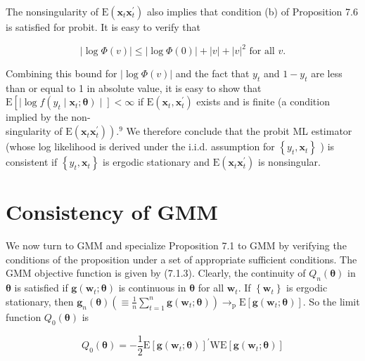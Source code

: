 \documentclass[10pt]{article}
\begin{document}
The nonsingularity of $\mathrm{E}\left(\mathbf{x}_{t} \mathbf{x}_{t}^{\prime}\right)$ also implies that condition (b) of Proposition 7.6 is satisfied for probit. It is easy to verify that


\begin{equation*}
|\log \Phi(v)| \leq|\log \Phi(0)|+|v|+|v|^{2} \text { for all } v . \tag{7.2.14}
\end{equation*}


Combining this bound for $|\log \Phi(v)|$ and the fact that $y_{t}$ and $1-y_{t}$ are less than or equal to 1 in absolute value, it is easy to show that $\mathrm{E}\left[\mid \log f\left(y_{t} \mid\right.\right. \left.\left.\mathbf{x}_{t} ; \boldsymbol{\theta}\right) \mid\right]<\infty$ if $\mathrm{E}\left(\mathbf{x}_{t}, \mathbf{x}_{t}^{\prime}\right)$ exists and is finite (a condition implied by the non-\\
singularity of $\left.\mathrm{E}\left(\mathbf{x}_{t} \mathbf{x}_{t}^{\prime}\right)\right) .{ }^{9}$ We therefore conclude that the probit ML estimator (whose log likelihood is derived under the i.i.d. assumption for $\left\{y_{t}, \mathbf{x}_{t}\right\}$ ) is consistent if $\left\{y_{t}, \mathbf{x}_{t}\right\}$ is ergodic stationary and $\mathrm{E}\left(\mathbf{x}_{t} \mathbf{x}_{t}^{\prime}\right)$ is nonsingular.

\section*{Consistency of GMM}
We now turn to GMM and specialize Proposition 7.1 to GMM by verifying the conditions of the proposition under a set of appropriate sufficient conditions. The GMM objective function is given by (7.1.3). Clearly, the continuity of $Q_{n}(\boldsymbol{\theta})$ in $\boldsymbol{\theta}$ is satisfied if $\mathbf{g}\left(\mathbf{w}_{t} ; \boldsymbol{\theta}\right)$ is continuous in $\boldsymbol{\theta}$ for all $\mathbf{w}_{t}$. If $\left\{\mathbf{w}_{t}\right\}$ is ergodic stationary, then $\mathbf{g}_{n}(\boldsymbol{\theta})\left(\equiv \frac{1}{n} \sum_{t=1}^{n} \mathbf{g}\left(\mathbf{w}_{t} ; \boldsymbol{\theta}\right)\right) \rightarrow_{\mathrm{p}} \mathrm{E}\left[\mathbf{g}\left(\mathbf{w}_{t} ; \boldsymbol{\theta}\right)\right]$. So the limit function $Q_{0}(\boldsymbol{\theta})$ is


\begin{equation*}
Q_{0}(\boldsymbol{\theta})=-\frac{1}{2} \mathrm{E}\left[\mathbf{g}\left(\mathbf{w}_{t} ; \boldsymbol{\theta}\right)\right]^{\prime} \mathrm{W} \mathrm{E}\left[\mathbf{g}\left(\mathbf{w}_{t} ; \boldsymbol{\theta}\right)\right] \tag{7.2.15}
\end{equation*}
\end{document}
